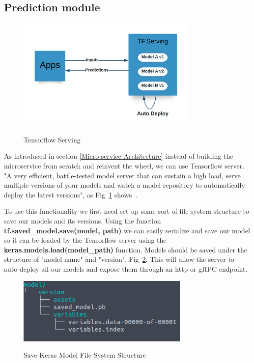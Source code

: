 \newpage
\subsection{Prediction module}
\label{prediction-module}

\begin{figure}[h]
    \centering
    \caption{Tensorflow Serving}
    \includegraphics[width=0.8\textwidth]{figures/serving.png}
    \label{fig:serving}
\end{figure}

As introduced in section \ref{Micro-service Architecture} instead of building the microservice from scratch and reinvent the wheel, we can use Tensorflow server. "A very efficient, battle-tested model server that can sustain a high load, serve multiple versions of your models and watch a model repository to automatically deploy the latest versions", as Fig~\ref{fig:serving} shows~\cite{handsOnMachine}.

To use this functionality we first need set up some sort of file system structure to save our models and its versions. Using the function \textbf{tf.saved\_model.save(model, path)} we can easily serialize and save our model so it can be loaded by the Tensorflow server using the \textbf{keras.models.load(model\_path)} function. Models should be saved under the structure of "model name" and "version", Fig~\ref{fig:model-save}. This will allow the server to auto-deploy all our models and expose them through an http or gRPC endpoint.

\begin{figure}[h]
    \centering
    \caption{Save Keras Model File System Structure}
    \includegraphics[width=0.75\textwidth]{figures/model-save.png}
    \label{fig:model-save}
\end{figure}

